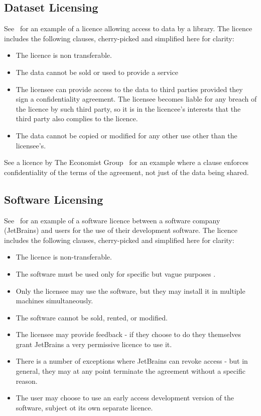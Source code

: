 \subsection{Dataset Licensing}\label{subsec:licensing:dataset}
See~\cite{seismicDataLicence} for an example of a licence allowing access to data by a library.
The licence includes the following clauses, cherry-picked and simplified here for clarity:
\begin{itemize}
    \item The licence is non transferable.
    \item The data cannot be sold or used to provide a service
    \item The licensee can provide access to the data to third parties provided they sign a confidentiality agreement.
    The licensee becomes liable for any breach of the licence by such third party, so it is in the licencee's interests
    that the third party also complies to the licence.
    \item The data cannot be copied or modified for any other use other than the licensee's.
\end{itemize}

See a licence by The Economist Group~\cite[]{economistIU2016licence} for an example
where a clause enforces confidentiality of the terms of the agreement, not just of the data
being shared.

\subsection{Software Licensing}\label{subsec:licensing:software}
See~\cite{jetbrainsEduLicence} for an example of a software licence between a software company (JetBrains) and users for
the use of their development software.
The licence includes the following clauses, cherry-picked and simplified here for clarity:
\begin{itemize}
    \item The licence is non-transferable.
    \item The software must be used only for specific but vague purposes \textcite[for non-commercial, educational purposes
    only]{jetbrainsEduLicence}.
    \item Only the licensee may use the software, but they may install it in multiple machines simultaneously.
    \item The software cannot be sold, rented, or modified.
    \item The licensee may provide feedback - if they choose to do they themselves grant JetBrains a very permissive
    licence to use it.
    \item There is a number of exceptions where JetBrains can revoke access - but in general, they may at any point
    terminate the agreement without a specific reason.
    \item The user may choose to use an early access development version of the software, subject ot its own separate
    licence.
\end{itemize}

